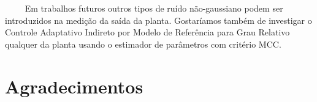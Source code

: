 \documentclass[conference,harvard,brazil,english]{sbatex}
\begin{document}
~~~~       Em trabalhos futuros outros tipos de ruído não-gaussiano podem ser introduzidos na medição da saída da
planta. Gostaríamos também de investigar o Controle Adaptativo Indireto por Modelo de Referência para Grau Relativo qualquer da planta usando o estimador de parâmetros com critério MCC.\\
\section*{Agradecimentos}


\end{document}
